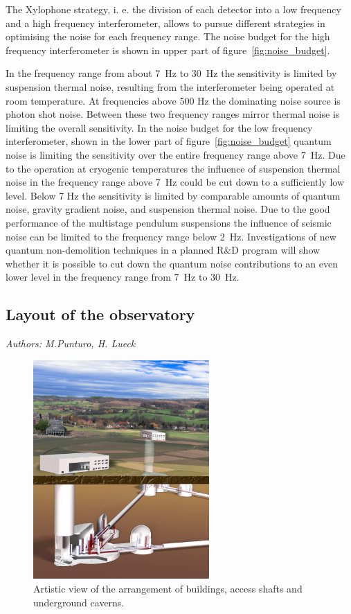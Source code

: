 The Xylophone strategy, i. e. the division of each detector into a low frequency and a high frequency interferometer, allows to pursue different strategies in optimising the noise for each frequency range. The noise budget for the high frequency interferometer is shown in upper part of figure~\ref{fig:noise_budget}. 

In the frequency range from about 7~Hz to 30~Hz the sensitivity is limited by suspension thermal noise, resulting from the interferometer being operated at room temperature. At frequencies above 500 Hz the dominating noise source is photon shot noise. Between these two frequency ranges mirror thermal noise is limiting the overall sensitivity. In the noise budget for the low frequency interferometer, shown in the lower part of figure~\ref{fig:noise_budget} quantum noise is limiting the sensitivity over the entire frequency range above 7~Hz. Due to the operation at cryogenic temperatures the influence of suspension thermal noise in the frequency range above 7~Hz could be cut down to a sufficiently low level. Below 7 Hz the sensitivity is limited by comparable amounts of quantum noise, gravity gradient noise, and suspension thermal noise. Due to the good performance of the multistage pendulum suspensions the influence of seismic noise can be limited to the frequency range below 2~Hz. Investigations of new quantum non-demolition techniques in a planned R\&D program will show whether it is possible to cut down the quantum noise contributions to an even lower level in the frequency range from 7~Hz to 30~Hz.

\FloatBarrier

\subsection{Layout of the observatory}
\emph{Authors: M.Punturo, H. Lueck} \\

\begin{figure}
\centering
\includegraphics[width=0.6\textwidth]{Sec_Introduction/ArtisticViewBuildings.jpg}
\caption{Artistic view of the arrangement of buildings, access shafts and underground caverns.}
\label{Fig:Buildings}
\end{figure} 

